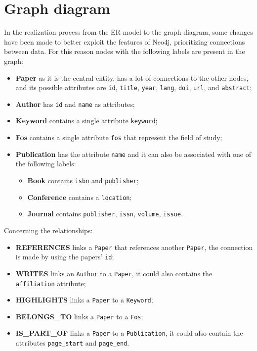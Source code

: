 \chapter{Graph diagram}
\label{ch:graph_diagram_neo4j}%
In the realization process from the ER model to the graph diagram, some changes have been made to better exploit the features of Neo4j, prioritizing connections between data.
For this reason nodes with the following labels are present in the graph:
\begin{itemize}
    \item \textbf{Paper} as it is the central entity, has a lot of connections to the other nodes, and its possible attributes are \verb|id|, \verb|title|, \verb|year|, \verb|lang|, \verb|doi|, \verb|url|, and \verb|abstract|;
    \item \textbf{Author} has \verb|id| and \verb|name| as attributes;
    \item \textbf{Keyword} contains a single attribute \verb|keyword|;
    \item \textbf{Fos} contains a single attribute \verb|fos| that represent the field of study;
    \item \textbf{Publication} has the attribute \verb|name| and it can also be associated with one of the following labels:
    \begin{itemize}
        \item \textbf{Book} contains \verb|isbn| and \verb|publisher|;
        \item \textbf{Conference} contains a \verb|location|;
        \item \textbf{Journal} contains \verb|publisher|, \verb|issn|, \verb|volume|, \verb|issue|.
    \end{itemize}
\end{itemize}
Concerning the relationships:
\begin{itemize}
    \item \textbf{REFERENCES} links a \verb|Paper| that references another \verb|Paper|, the connection is made by using the papers' \verb|id|;
    \item \textbf{WRITES} links an \verb|Author| to a \verb|Paper|, it could also contains the \verb|affiliation| attribute;
    \item \textbf{HIGHLIGHTS} links a \verb|Paper| to a \verb|Keyword|;
    \item \textbf{BELONGS\_TO} links a \verb|Paper| to a \verb|Fos|;
    \item \textbf{IS\_PART\_OF} links a \verb|Paper| to a \verb|Publication|, it could also contain the attributes \verb|page_start| and \verb|page_end|.
\end{itemize}


